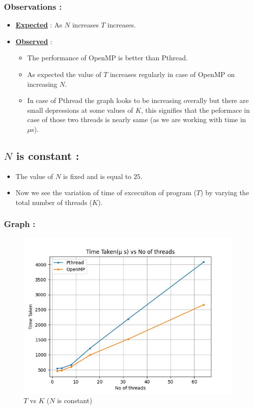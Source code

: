 \documentclass[12pt,a4paper]{article}
\begin{document}
	\subsubsection{Observations :}
	\begin{itemize}
		\item \underline{\textbf{Expected}} : As $N$ increases $T$ increases.
		\item \underline{\textbf{Observed}} : 
		\begin{itemize}
			\item The performance of OpenMP is better than Pthread.
			\item As expected the value of $T$ increases regularly in case of OpenMP on increasing $N$.
			\item In case of Pthread the graph looks to be increasing overally but there are small depressions at some values of $K$, this signifies that the peformace in case of those two threads is nearly same (as we are working with time in $\mu$s).
		\end{itemize}
		
	\end{itemize}
	\pagebreak
	\subsection{$N$ is constant :}
	\begin{itemize}
		\item The value of $N$ is fixed and is equal to $25$.
		\item Now we see the variation of time of excecuiton of program ($T$) by varying the total number of threads ($K$).
	\end{itemize}
	\subsubsection{Graph :}
	\begin{figure}[H]
		\centering
		\includegraphics[width=1\textwidth]{plot_N_const}
		\caption{$T$ vs $K$ ($N$ is constant)}
	\end{figure}
\end{document}
